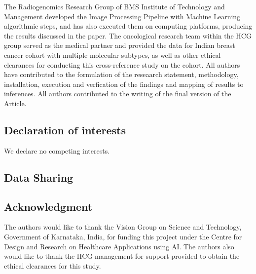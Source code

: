 \documentclass[final,1p,times,twocolumn]{elsarticle}
\begin{document}
The Radiogenomics Research Group of BMS Institute of Technology and Management developed the Image Processing Pipeline with Machine Learning algorithmic steps, and has also executed them on computing platforms, producing the results discussed in the paper. The oncological research team within the HCG group served as the medical partner and provided the data for Indian breast cancer cohort with multiple molecular subtypes, as well as other ethical clearances for conducting this cross-reference study on the cohort. All authors have contributed to the formulation of the reseaarch statement, methodology, installation, execution and verfication of the findings and mapping of results to inferences. All authors contributed to the writing of the final version of the Article.

\subsection{Declaration of interests}
We declare no competing interests.

\subsection{Data Sharing}



\subsection{Acknowledgment}

The authors would like to thank the Vision Group on Science and Technology, Government of Karnataka, India, for funding this project under the Centre for Design and Research on Healthcare Applications using AI. The authors also would like to thank the HCG management for support provided to obtain the ethical clearances for this study.



\end{document}
